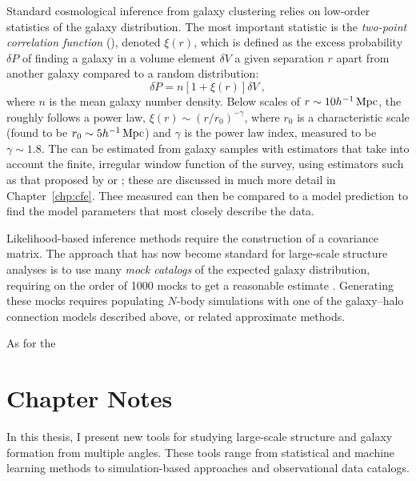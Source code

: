 Standard cosmological inference from galaxy clustering relies on low-order statistics of the galaxy distribution. 
The most important statistic is the \emph{two-point correlation function} (\cf), denoted $\xi(r)$, which is defined as the excess probability $\delta P$ of finding a galaxy in a volume element $\delta V$ a given separation $r$ apart from another galaxy compared to a random distribution:
\begin{equation}
    \delta P = n[1+\xi(r)]\delta V ~,
\end{equation}
where $n$ is the mean galaxy number density.
Below scales of $r \sim 10 h^{-1}\,\mathrm{Mpc}$, the \cf roughly follows a power law, $\xi(r) \sim (r/r_0)^{-\gamma}$, where $r_0$ is a characteristic scale (found to be $r_0 \sim 5 h^{-1}\,\mathrm{Mpc}$) and $\gamma$ is the power law index, measured to be $\gamma \sim 1.8$.
The \cf can be estimated from galaxy samples with estimators that take into account the finite, irregular window function of the survey, using estimators such as that proposed by \cite{DavisPeebles1983} or \cite{LandySzalay1993}; these are discussed in much more detail in Chapter~\ref{chp:cfe}.
Thee measured \cf can then be compared to a model prediction to find the model parameters that most closely describe the data.

Likelihood-based inference methods require the construction of a covariance matrix.
The approach that has now become standard for large-scale structure analyses is to use many \emph{mock catalogs} of the expected galaxy distribution, requiring on the order of 1000 mocks to get a reasonable estimate \citep{Anderson2012,Kitaura2016,Beutler2017}.
Generating these mocks requires populating $N$-body simulations with one of the galaxy--halo connection models described above, or related approximate methods.

As for the 




\section{Chapter Notes}

In this thesis, I present new tools for studying large-scale structure and galaxy formation from multiple angles.
These tools range from statistical and machine learning methods to simulation-based approaches and observational data catalogs.

